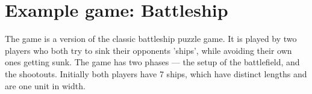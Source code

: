 





%

\chapter{Example game: Battleship}\label{sect:Example}


	The game is a version of the classic battleship puzzle game. It is played by two players who both try to sink their opponents 'ships', while avoiding their own ones getting sunk.
	The game has two phases --- the setup of the battlefield, and the shootouts.
	Initially both players have 7 ships, which have distinct lengths and are one unit in width.
	
